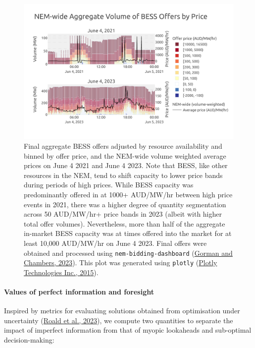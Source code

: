 \documentclass[12pt,a4paper,]{report}
\begin{document}
\begin{figure}
\hypertarget{fig:nem_bess_bidding}{%
\centering
\includegraphics{source/figures/aggregate_bess_bidding_0406_2021_2023.pdf}
\caption[Aggregated final BESS offers on June 4 2021 and June 4
2023]{Final aggregate BESS offers adjusted by resource availability and
binned by offer price, and the NEM-wide volume weighted average prices
on June 4 2021 and June 4 2023. Note that BESS, like other resources in
the NEM, tend to shift capacity to lower price bands during periods of
high prices. While BESS capacity was predominantly offered in at 1000+
AUD/MW/hr between high price events in 2021, there was a higher degree
of quantity segmentation across 50 AUD/MW/hr+ price bands in 2023
(albeit with higher total offer volumes). Nevertheless, more than half
of the aggregate in-market BESS capacity was at times offered into the
market for at least 10,000 AUD/MW/hr on June 4 2023. Final offers were
obtained and processed using \texttt{nem-bidding-dashboard}
(\protect\hyperlink{ref-gormanNembiddingdashboard2023}{Gorman and
Chambers, 2023}). This plot was generated using \texttt{plotly}
(\protect\hyperlink{ref-plotlytechnologiesinc.CollaborativeDataScience2015}{Plotly
Technologies Inc., 2015}).}\label{fig:nem_bess_bidding}
}
\end{figure}

\hypertarget{values-of-perfect-information-and-foresight}{%
\paragraph{Values of perfect information and
foresight}\label{values-of-perfect-information-and-foresight}}

Inspired by metrics for evaluating solutions obtained from optimisation
under uncertainty
(\protect\hyperlink{ref-roaldPowerSystemsOptimization2023}{Roald et al.,
2023}), we compute two quantities to separate the impact of imperfect
information from that of myopic lookaheads and sub-optimal
decision-making:
\end{document}
